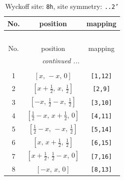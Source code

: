 \documentclass[fleqn,8pt]{jsarticle}
\begin{document}
\begin{longtable}{ccc}
\caption{Wyckoff site: {\tt 8h}, site symmetry: {\tt ..2'}}
 \\
 \hline \hline
No. & position & mapping \\ \hline \endfirsthead

\multicolumn{2}{l}{\tablename\ \thetable{}} \\
 \hline \hline
No. & position & mapping \\ \hline \endhead

 \hline \hline
\multicolumn{2}{r}{\footnotesize\it continued ...} \\ \endfoot

 \hline \hline
\multicolumn{2}{r}{} \\ \endlastfoot

1 & $\left[ x,\, - x,\, 0 \right]$ & {\tt [1,12]} \\ \hline
2 & $\left[ x + \frac{1}{2},\, x,\, \frac{1}{2} \right]$ & {\tt [2,9]} \\ \hline
3 & $\left[ - x,\, \frac{1}{2} - x,\, \frac{1}{2} \right]$ & {\tt [3,10]} \\ \hline
4 & $\left[ \frac{1}{2} - x,\, x + \frac{1}{2},\, 0 \right]$ & {\tt [4,11]} \\ \hline
5 & $\left[ \frac{1}{2} - x,\, - x,\, \frac{1}{2} \right]$ & {\tt [5,14]} \\ \hline
6 & $\left[ x,\, x + \frac{1}{2},\, \frac{1}{2} \right]$ & {\tt [6,15]} \\ \hline
7 & $\left[ x + \frac{1}{2},\, \frac{1}{2} - x,\, 0 \right]$ & {\tt [7,16]} \\ \hline
8 & $\left[ - x,\, x,\, 0 \right]$ & {\tt [8,13]} \\
\end{longtable}
\renewcommand{\arraystretch}{1.2}
\end{document}
